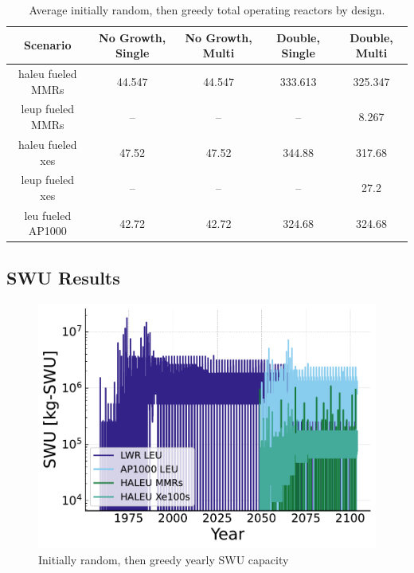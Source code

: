 \begin{table}[H]
    \centering
    \caption{Average initially random, then greedy total operating reactors by design.}
    \label{tab:rand_greed_reac_avg}
    \begin{tabular}{c c c c c}
       \hline
       Scenario & No Growth, Single & No Growth, Multi & Double, Single & Double, Multi  \\
       \hline
       \gls{haleu} fueled MMRs      & 44.547  & 44.547  & 333.613 & 325.347 \\
       \gls{leup} fueled MMRs       & --      & --      & --      & 8.267   \\
       \gls{haleu} fueled \gls{xe}s & 47.52   & 47.52   & 344.88  & 317.68  \\
       \gls{leup} fueled \gls{xe}s  & --      & --      & --      & 27.2    \\
       \gls{leu} fueled AP1000      & 42.72   & 42.72   & 324.68  & 324.68  \\
       \hline
    \end{tabular}
\end{table}

\subsection{SWU Results}
\label{sec:rand_greed_swu}



\begin{figure}[H]
    \centering
    \includegraphics[scale=0.7]{images/results/swu/multi_drgng_swu_by_fuel.pdf}
    \caption{Initially random, then greedy yearly SWU capacity}
    \label{fig:swu_yearly_rand_greed}
\end{figure}

